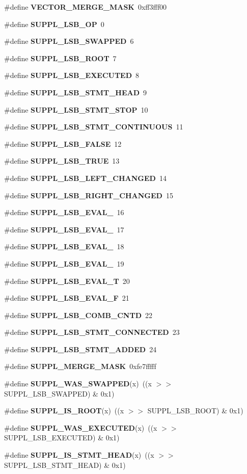 \begin{CompactItemize}
\item 
\#define {\bf VECTOR\_\-MERGE\_\-MASK}\ 0xff3fff00
\item 
\#define {\bf SUPPL\_\-LSB\_\-OP}\ 0
\item 
\#define {\bf SUPPL\_\-LSB\_\-SWAPPED}\ 6
\item 
\#define {\bf SUPPL\_\-LSB\_\-ROOT}\ 7
\item 
\#define {\bf SUPPL\_\-LSB\_\-EXECUTED}\ 8
\item 
\#define {\bf SUPPL\_\-LSB\_\-STMT\_\-HEAD}\ 9
\item 
\#define {\bf SUPPL\_\-LSB\_\-STMT\_\-STOP}\ 10
\item 
\#define {\bf SUPPL\_\-LSB\_\-STMT\_\-CONTINUOUS}\ 11
\item 
\#define {\bf SUPPL\_\-LSB\_\-FALSE}\ 12
\item 
\#define {\bf SUPPL\_\-LSB\_\-TRUE}\ 13
\item 
\#define {\bf SUPPL\_\-LSB\_\-LEFT\_\-CHANGED}\ 14
\item 
\#define {\bf SUPPL\_\-LSB\_\-RIGHT\_\-CHANGED}\ 15
\item 
\#define {\bf SUPPL\_\-LSB\_\-EVAL\_}\ 16
\item 
\#define {\bf SUPPL\_\-LSB\_\-EVAL\_}\ 17
\item 
\#define {\bf SUPPL\_\-LSB\_\-EVAL\_}\ 18
\item 
\#define {\bf SUPPL\_\-LSB\_\-EVAL\_}\ 19
\item 
\#define {\bf SUPPL\_\-LSB\_\-EVAL\_\-T}\ 20
\item 
\#define {\bf SUPPL\_\-LSB\_\-EVAL\_\-F}\ 21
\item 
\#define {\bf SUPPL\_\-LSB\_\-COMB\_\-CNTD}\ 22
\item 
\#define {\bf SUPPL\_\-LSB\_\-STMT\_\-CONNECTED}\ 23
\item 
\#define {\bf SUPPL\_\-LSB\_\-STMT\_\-ADDED}\ 24
\item 
\#define {\bf SUPPL\_\-MERGE\_\-MASK}\ 0xfe7fffff
\item 
\#define {\bf SUPPL\_\-WAS\_\-SWAPPED}(x)\ ((x $>$$>$ SUPPL\_\-LSB\_\-SWAPPED) \& 0x1)
\item 
\#define {\bf SUPPL\_\-IS\_\-ROOT}(x)\ ((x $>$$>$ SUPPL\_\-LSB\_\-ROOT) \& 0x1)
\item 
\#define {\bf SUPPL\_\-WAS\_\-EXECUTED}(x)\ ((x $>$$>$ SUPPL\_\-LSB\_\-EXECUTED) \& 0x1)
\item 
\#define {\bf SUPPL\_\-IS\_\-STMT\_\-HEAD}(x)\ ((x $>$$>$ SUPPL\_\-LSB\_\-STMT\_\-HEAD) \& 0x1)
\item 

\end{CompactItemize}
